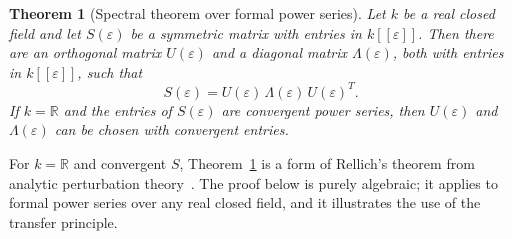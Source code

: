 \documentclass[12pt, a4paper]{report}
\theoremstyle{plain}
\newtheorem{theorem}{Theorem}[chapter]
\theoremstyle{definition}
\theoremstyle{remark}
\theoremstyle{plain}
\newcommand{\RR}{\mathbb{R}}
\begin{document}
\begin{theorem}[Spectral theorem over formal power series]\label{thm:spectral-power-series}
Let $k$ be a real closed field and let $S(\varepsilon)$ be a symmetric matrix with entries in $k[[\varepsilon]]$. Then there are an orthogonal matrix $U(\varepsilon)$ and a diagonal matrix $\Lambda(\varepsilon)$, both with entries in $k[[\varepsilon]]$, such that
\[ S(\varepsilon) = U(\varepsilon)\,\Lambda(\varepsilon)\,U(\varepsilon)^T. \]
If $k=\RR$ and the entries of $S(\varepsilon)$ are convergent power series, then $U(\varepsilon)$ and $\Lambda(\varepsilon)$ can be chosen with convergent entries.
\end{theorem}

For $k=\RR$ and convergent $S$, Theorem~\ref{thm:spectral-power-series} is a form of Rellich's theorem from analytic perturbation theory~\cite[Chapter~II]{Kato1995}. The proof below is purely algebraic; it applies to formal power series over any real closed field, and it illustrates the use of the transfer principle.
\end{document}
